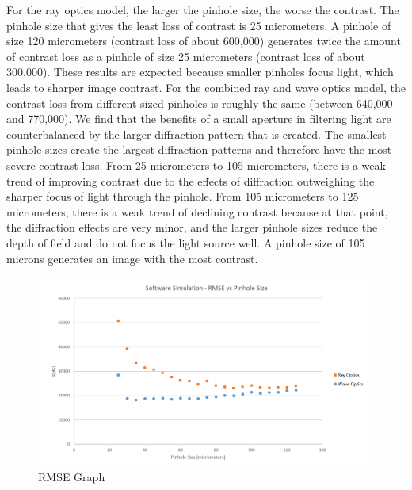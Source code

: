For the ray optics model, the larger the pinhole size, the worse the contrast. The pinhole size that gives the least loss of contrast is 25 micrometers. A pinhole of size 120 micrometers (contrast loss of about 600,000) generates twice the amount of contrast loss as a pinhole of size 25 micrometers (contrast loss of about 300,000). These results are expected because smaller pinholes focus light, which leads to sharper image contrast. For the combined ray and wave optics model, the contrast loss from different-sized pinholes is roughly the same (between 640,000 and 770,000). We find that the benefits of a small aperture in filtering light are counterbalanced by the larger diffraction pattern that is created. The smallest pinhole sizes create the largest diffraction patterns and therefore have the most severe contrast loss. From 25 micrometers to 105 micrometers, there is a weak trend of improving contrast due to the effects of diffraction outweighing the sharper focus of light through the pinhole. From 105 micrometers to 125 micrometers, there is a weak trend of declining contrast because at that point, the diffraction effects are very minor, and the larger pinhole sizes reduce the depth of field and do not focus the light source well. A pinhole size of 105 microns generates an image with the most contrast.

\begin{figure}[ht]
  \centering
  \includegraphics[width=7.0in]{chapters/chapter8/images/RMSE.png}
  \caption{RMSE Graph}
  \label{fig:ferrari}
\end{figure}


